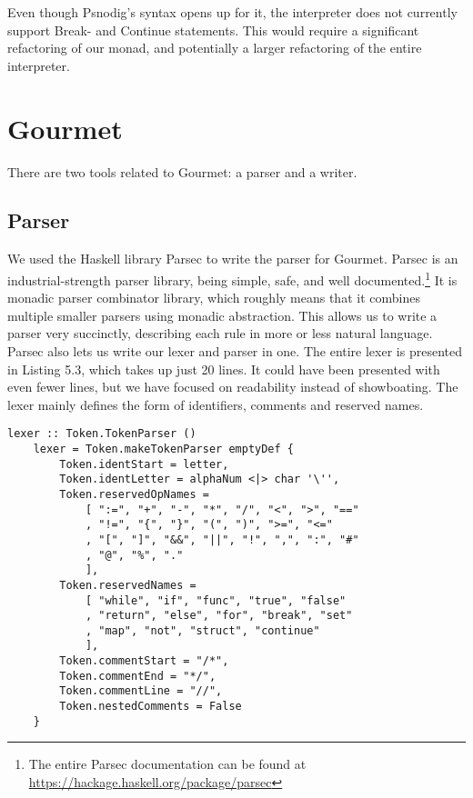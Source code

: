Even though Psnodig's syntax opens up for it, the interpreter does not currently support Break- and Continue statements. This would require a significant refactoring of our monad, and potentially a larger refactoring of the entire interpreter. \hfill \\


\section{Gourmet}

There are two tools related to Gourmet: a parser and a writer. 

\subsection{Parser}

We used the Haskell library Parsec to write the parser for Gourmet. Parsec is an industrial-strength parser library, being simple, safe, and well documented.\footnote{The entire Parsec documentation can be found at \url{https://hackage.haskell.org/package/parsec}} It is monadic parser combinator library, which roughly means that it combines multiple smaller parsers using monadic abstraction. This allows us to write a parser very succinctly, describing each rule in more or less natural language. \hfill \\

Parsec also lets us write our lexer and parser in one. The entire lexer is presented in Listing 5.3, which takes up just 20 lines. It could have been presented with even fewer lines, but we have focused on readability instead of showboating. The lexer mainly defines the form of identifiers, comments and reserved names. \hfill \\

\begin{lstlisting}[caption={The Gourmet lexer}, captionpos=b, frame=trbl]
    lexer :: Token.TokenParser ()
    lexer = Token.makeTokenParser emptyDef {
        Token.identStart = letter,
        Token.identLetter = alphaNum <|> char '\'',
        Token.reservedOpNames =
            [ ":=", "+", "-", "*", "/", "<", ">", "=="
            , "!=", "{", "}", "(", ")", ">=", "<="
            , "[", "]", "&&", "||", "!", ",", ":", "#"
            , "@", "%", "."
            ],
        Token.reservedNames =
            [ "while", "if", "func", "true", "false"
            , "return", "else", "for", "break", "set"
            , "map", "not", "struct", "continue"
            ],
        Token.commentStart = "/*",
        Token.commentEnd = "*/",
        Token.commentLine = "//",
        Token.nestedComments = False
    }
\end{lstlisting}

